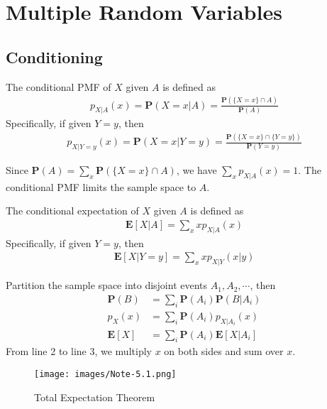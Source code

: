 \section{Multiple Random Variables}
\subsection{Conditioning}
\begin{definition}
    The conditional PMF of $X$ given $A$ is defined as
    \begin{align}
        p_{X|A}(x) = \mathbf{P}(X = x | A) = \frac{\mathbf{P}(\{X = x\} \cap A)}{\mathbf{P}(A)}
    \end{align}
    Specifically, if given $Y = y$, then
    \begin{align}
        p_{X|Y = y}(x) = \mathbf{P}(X = x | Y = y) = \frac{\mathbf{P}(\{X = x\} \cap \{Y = y\})}{\mathbf{P}(Y = y)}
    \end{align}
\end{definition}
Since $\mathbf{P}(A) = \sum_{x} \mathbf{P}(\{X = x\} \cap A)$, we have $\sum_{x} p_{X|A}(x) = 1$.
The conditional PMF limits the sample space to $A$.
\begin{definition}
    The conditional expectation of $X$ given $A$ is defined as
    \begin{align}
        \mathbf{E}[X|A] = \sum_{x} x p_{X|A}(x)
    \end{align}
    Specifically, if given $Y = y$, then
    \begin{align}
        \mathbf{E}[X|Y = y] = \sum_{x} x p_{X|Y}(x|y)
    \end{align}
\end{definition}
\begin{theorem}
    Partition the sample space into disjoint events $A_{1}, A_{2}, \cdots$, then
    \begin{equation}
    \begin{aligned}
        \mathbf{P}(B) &= \sum_{i} \mathbf{P}(A_{i}) \mathbf{P}(B|A_{i}) \\ 
        p_{X}(x) &= \sum_{i} \mathbf{P}(A_{i}) p_{X|A_{i}}(x) \\
        \mathbf{E}[X] &= \sum_{i} \mathbf{P}(A_{i}) \mathbf{E}[X|A_{i}]
    \end{aligned}
    \end{equation}
    From line 2 to line 3, we multiply $x$ on both sides and sum over $x$.
    \begin{figure}[H]
        \centering
        \texttt{[image: images/Note-5.1.png]}
        \caption{Total Expectation Theorem}
    \end{figure}
\end{theorem}
